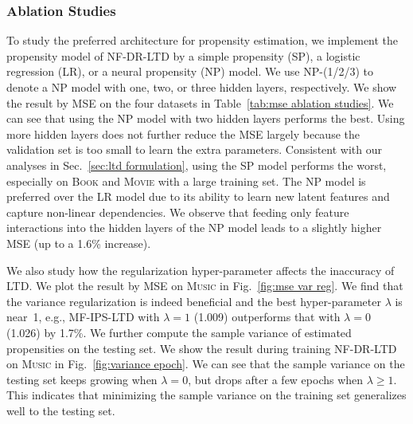 \documentclass[letterpaper]{article} %
\newcommand{\regularization}{\lambda}
\begin{document}
\subsubsection{Ablation Studies}
To study the preferred architecture for propensity estimation, we implement the propensity model of NF-DR-LTD by a simple propensity (SP), a logistic regression (LR), or a neural propensity (NP) model.
We use NP-(1/2/3) to denote a NP model with one, two, or three hidden layers, respectively.
We show the result by MSE on the four datasets in Table~\ref{tab:mse ablation studies}.
We can see that using the NP model with two hidden layers performs the best.
Using more hidden layers does not further reduce the MSE largely because the validation set is too small to learn the extra parameters.
Consistent with our analyses in Sec.~\ref{sec:ltd formulation}, using the SP model performs the worst, especially on \textsc{Book} and \textsc{Movie} with a large training set.
The NP model is preferred over the LR model due to its ability to learn new latent features and capture non-linear dependencies.
We observe that feeding only feature interactions into the hidden layers of the NP model leads to a slightly higher MSE (up to a 1.6\% increase).

We also study how the regularization hyper-parameter affects the inaccuracy of LTD.
We plot the result by MSE on \textsc{Music} in Fig.~\ref{fig:mse var reg}.
We find that the variance regularization is indeed beneficial and the best hyper-parameter $\regularization$ is near~1, e.g., MF-IPS-LTD with $\regularization=1$ (1.009) outperforms that with $\regularization=0$ (1.026) by 1.7\%.
We further compute the sample variance of estimated propensities on the testing set.
We show the result during training NF-DR-LTD on \textsc{Music} in Fig.~\ref{fig:variance epoch}.
We can see that the sample variance on the testing set keeps growing when $\regularization=0$, but drops after a few epochs when $\regularization\geq1$.
This indicates that minimizing the sample variance on the training set generalizes well to the testing set.
\end{document}
